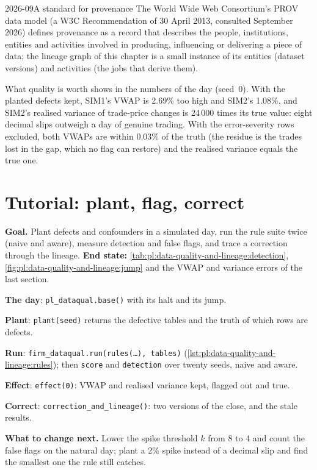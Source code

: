 \begin{dated}{2026-09}{A standard for provenance}\label{dat:pl:data-quality-and-lineage:prov}
The World Wide Web Consortium's PROV data model (a W3C Recommendation of 30 April 2013, consulted September 2026) defines provenance
as a record that describes the people, institutions, entities and activities involved in producing, influencing or delivering a
piece of data; the lineage graph of this chapter is a small instance of its entities (dataset versions) and activities (the jobs
that derive them).
\end{dated}

What quality is worth shows in the numbers of the day (seed~0). With the planted defects kept, SIM1's VWAP is 2.69\% too high and
SIM2's 1.08\%, and SIM2's realised variance of trade-price changes is 24\,000 times its true value: eight decimal slips outweigh a
day of genuine trading. With the error-severity rows excluded, both VWAPs are within 0.03\% of the truth (the residue is the trades
lost in the gap, which no flag can restore) and the realised variance equals the true one.

\section{Tutorial: plant, flag, correct}\label{tut:pl:data-quality-and-lineage:tut}

\begin{tutorial}
\textbf{Goal.} Plant defects and confounders in a simulated day, run the rule suite twice (naive and aware), measure detection and
false flags, and trace a correction through the lineage. \textbf{End state:}
\cref{tab:pl:data-quality-and-lineage:detection}, \cref{fig:pl:data-quality-and-lineage:jump} and the VWAP and variance errors of the
last section.
\begin{tutsteps}
\item \textbf{The day}: \texttt{pl\_dataqual.base()} with its halt and its jump.
\item \textbf{Plant}: \texttt{plant(seed)} returns the defective tables and the truth of which rows are defects.
\item \textbf{Run}: \texttt{firm\_dataqual.run(rules(\dots), tables)} (\cref{lst:pl:data-quality-and-lineage:rules}); then
\texttt{score} and \texttt{detection} over twenty seeds, naive and aware.
\item \textbf{Effect}: \texttt{effect(0)}: VWAP and realised variance kept, flagged out and true.
\item \textbf{Correct}: \texttt{correction\_and\_lineage()}: two versions of the close, and the stale results.
\end{tutsteps}
\textbf{What to change next.} Lower the spike threshold $k$ from 8 to 4 and count the false flags on the natural day; plant a 2\%
spike instead of a decimal slip and find the smallest one the rule still catches.
\end{tutorial}

